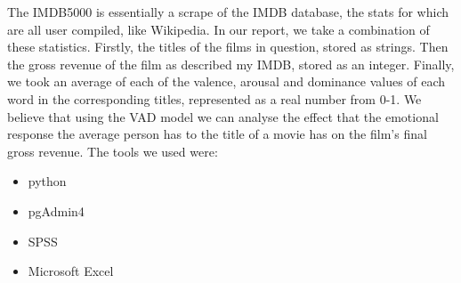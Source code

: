 \documentclass[10pt,a4paper]{article}
\begin{document}
    The IMDB5000 is essentially a scrape of the IMDB database, the stats for which are all user compiled, like Wikipedia.
    \newline \newline
    In our report, we take a combination of these statistics. Firstly, the titles of the films in question, stored as strings. Then the gross revenue of the film as described my IMDB, stored as an integer. Finally, we took an average of each of the valence, arousal and dominance values of each word in the corresponding titles, represented as a real number from 0-1.
    \newline \newline
    We believe that using the VAD model we can analyse the effect that the emotional response the average person has to the title of a movie has on the film's final gross revenue.
    \newline \newline
    The tools we used were:

    \begin{itemize}
        \item python
        \item pgAdmin4
        \item SPSS
        \item Microsoft Excel
    \end{itemize}
\end{document}
